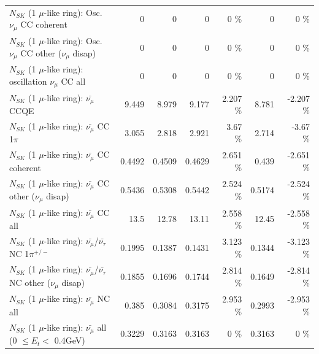 \begin{table}
\begin{tabular}{| l | r | r | r  r | r  r |}
                        $N_{SK}$ (1 $\mu$-like ring): Osc. $\nu_\mu$ CC coherent &               0 &               0 &               0 &        0 \%  &               0 &        0 \%  \\ 
         $N_{SK}$ (1 $\mu$-like ring): Osc. $\nu_\mu$ CC other ($\nu_\mu$ disap) &               0 &               0 &               0 &        0 \%  &               0 &        0 \%  \\ 
                      $N_{SK}$ (1 $\mu$-like ring): oscillation $\nu_\mu$ CC all &               0 &               0 &               0 &        0 \%  &               0 &        0 \%  \\ 
\hline
\hline
                              $N_{SK}$ (1 $\mu$-like ring): $\bar{\nu_\mu}$ CCQE &           9.449 &           8.979 &           9.177 &    2.207 \%  &           8.781 &   -2.207 \%  \\ 
                         $N_{SK}$ (1 $\mu$-like ring): $\bar{\nu_\mu}$ CC 1$\pi$ &           3.055 &           2.818 &           2.921 &     3.67 \%  &           2.714 &    -3.67 \%  \\ 
                       $N_{SK}$ (1 $\mu$-like ring): $\bar{\nu_\mu}$ CC coherent &          0.4492 &          0.4509 &          0.4629 &    2.651 \%  &           0.439 &   -2.651 \%  \\ 
        $N_{SK}$ (1 $\mu$-like ring): $\bar{\nu_\mu}$ CC other ($\nu_\mu$ disap) &          0.5436 &          0.5308 &          0.5442 &    2.524 \%  &          0.5174 &   -2.524 \%  \\ 
                          $N_{SK}$ (1 $\mu$-like ring): $\bar{\nu_{\mu}}$ CC all &            13.5 &           12.78 &           13.11 &    2.558 \%  &           12.45 &   -2.558 \%  \\ 
\hline
  $N_{SK}$ (1 $\mu$-like ring): $\bar{\nu_\mu}$/$\bar{\nu_\tau}$ NC 1$\pi^{+/-}$ &          0.1995 &          0.1387 &          0.1431 &    3.123 \%  &          0.1344 &   -3.123 \%  \\ 
$N_{SK}$ (1 $\mu$-like ring): $\bar{\nu_\mu}$/$\bar{\nu_\tau}$ NC other ($\nu_\mu$ disap) &          0.1855 &          0.1696 &          0.1744 &    2.814 \%  &          0.1649 &   -2.814 \%  \\ 
                          $N_{SK}$ (1 $\mu$-like ring): $\bar{\nu_{\mu}}$ NC all &           0.385 &          0.3084 &          0.3175 &    2.953 \%  &          0.2993 &   -2.953 \%  \\ 
\hline
   $N_{SK}$ (1 $\mu$-like ring): $\bar{\nu_{\mu}}$ all (0 $\leq E_{t} <$ 0.4GeV) &          0.3229 &          0.3163 &          0.3163 &        0 \%  &          0.3163 &        0 \%  \\ 

\end{tabular}
\end{table}
